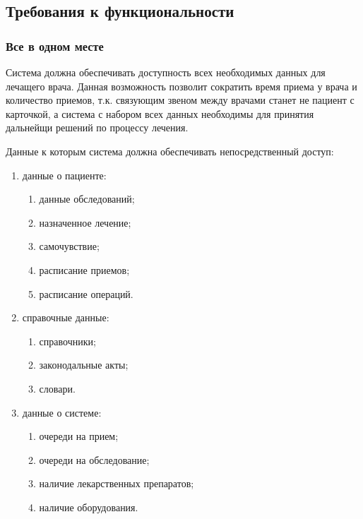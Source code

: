 \subsection{Требования к функциональности}
\subsubsection{Все в одном месте}
Система должна обеспечивать доступность всех необходимых данных для лечащего врача. Данная возможность позволит сократить время приема у врача и количество приемов, т.к. связующим звеном между врачами станет не пациент с карточкой, а система с набором всех данных необходимы для принятия дальнейщи решений по процессу лечения.

Данные к которым система должна обеспечивать непосредственный доступ:

\begin{enumerate}
  \item данные о пациенте:
  \begin{enumerate}
    \item данные обследований;
    \item назначенное лечение;
    \item самочувствие;
    \item расписание приемов;
    \item расписание операций.
  \end{enumerate}
  \item справочные данные:
  \begin{enumerate}
    \item справочники;
    \item законодальные акты;
    \item словари.
  \end{enumerate}
  \item данные о системе:
  \begin{enumerate}
    \item очереди на прием;
    \item очереди на обследование;
    \item наличие лекарственных препаратов;
    \item наличие оборудования.
  \end{enumerate}     
\end{enumerate}




